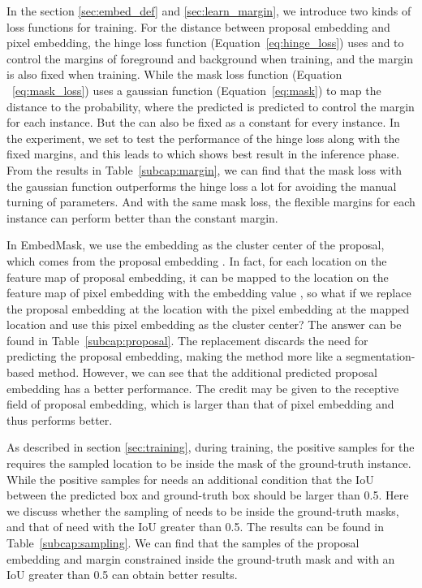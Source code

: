 \documentclass[10pt,twocolumn,letterpaper]{article}
\begin{document}
\medbreak
{}
In the section \ref{sec:embed_def} and \ref{sec:learn_margin}, we introduce two kinds of loss functions for training. 
For the distance between proposal embedding and pixel embedding, the hinge loss function (Equation~\ref{eq:hinge_loss}) uses  and  to control the margins of foreground and background when training, and the margin  is also fixed when training. 
While the mask loss function (Equation ~\ref{eq:mask_loss}) uses a gaussian function (Equation~\ref{eq:mask}) to map the distance to the probability, where the predicted  is predicted to control the margin for each instance. 
But the  can also be fixed as a constant for every instance. 
In the experiment, we set  to test the performance of the hinge loss along with the fixed margins, and this leads to  which shows best result in the inference phase. 
From the results in Table~\ref{subcap:margin}, we can find that the mask loss with the gaussian function outperforms the hinge loss a lot for avoiding the manual turning of parameters. And with the same mask loss, the flexible margins for each instance can perform better than the constant margin. 


\medbreak
{}
In EmbedMask, we use the embedding  as the cluster center of the proposal, which comes from the proposal embedding . 
In fact, for each location  on the feature map of proposal embedding, it can be mapped to the location  on the feature map of pixel embedding with the embedding value , so what if we replace the proposal embedding  at the location  with the pixel embedding  at the mapped location  and use this pixel embedding as the cluster center? 
The answer can be found in Table~\ref{subcap:proposal}. 
The replacement discards the need for predicting the proposal embedding, making the method more like a segmentation-based method. 
However, we can see that the additional predicted proposal embedding has a better performance. 
The credit may be given to the receptive field of proposal embedding, which is larger than that of pixel embedding and thus performs better.

\medbreak
{}
As described in section \ref{sec:training}, during training, the positive samples for the  requires the sampled location to be inside the mask of the ground-truth instance. 
While the positive samples for  needs an additional condition that the IoU between the predicted box  and ground-truth box should be larger than 0.5. 
Here we discuss whether the sampling of  needs to be inside the ground-truth masks, and that of  need with the IoU greater than 0.5. 
The results can be found in Table~\ref{subcap:sampling}. 
We can find that the samples of the proposal embedding and margin constrained inside the ground-truth mask and with an IoU greater than 0.5 can obtain better results.
\end{document}
